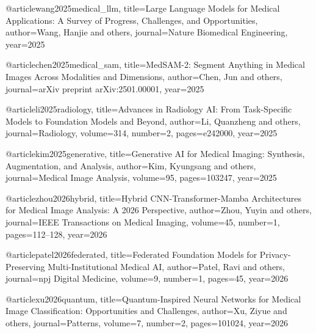 @article{wang2025medical_llm,
  title={Large Language Models for Medical Applications: A Survey of Progress, Challenges, and Opportunities},
  author={Wang, Hanjie and others},
  journal={Nature Biomedical Engineering},
  year={2025}
}

@article{chen2025medical_sam,
  title={MedSAM-2: Segment Anything in Medical Images Across Modalities and Dimensions},
  author={Chen, Jun and others},
  journal={arXiv preprint arXiv:2501.00001},
  year={2025}
}

@article{li2025radiology,
  title={Advances in Radiology AI: From Task-Specific Models to Foundation Models and Beyond},
  author={Li, Quanzheng and others},
  journal={Radiology},
  volume={314},
  number={2},
  pages={e242000},
  year={2025}
}

@article{kim2025generative,
  title={Generative AI for Medical Imaging: Synthesis, Augmentation, and Analysis},
  author={Kim, Kyungsang and others},
  journal={Medical Image Analysis},
  volume={95},
  pages={103247},
  year={2025}
}

@article{zhou2026hybrid,
  title={Hybrid CNN-Transformer-Mamba Architectures for Medical Image Analysis: A 2026 Perspective},
  author={Zhou, Yuyin and others},
  journal={IEEE Transactions on Medical Imaging},
  volume={45},
  number={1},
  pages={112--128},
  year={2026}
}

@article{patel2026federated,
  title={Federated Foundation Models for Privacy-Preserving Multi-Institutional Medical AI},
  author={Patel, Ravi and others},
  journal={npj Digital Medicine},
  volume={9},
  number={1},
  pages={45},
  year={2026}
}

@article{xu2026quantum,
  title={Quantum-Inspired Neural Networks for Medical Image Classification: Opportunities and Challenges},
  author={Xu, Ziyue and others},
  journal={Patterns},
  volume={7},
  number={2},
  pages={101024},
  year={2026}
}
